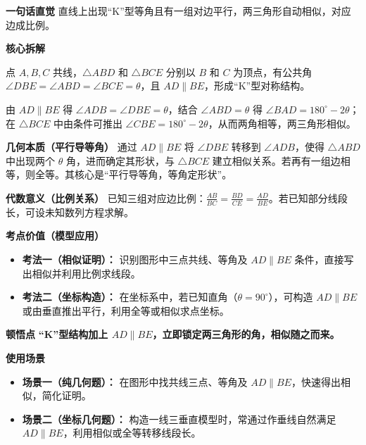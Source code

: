 \begin{explanationbox}
	\textbf{\textcolor{CExplanation}{一句话直觉}}
	直线上出现“K”型等角且有一组对边平行，两三角形自动相似，对应边成比例。

	\medskip
	\textbf{\textcolor{CExplanation}{核心拆解}}
	\begin{description}[style=nextline, leftmargin=2.8em, labelsep=0.5em, itemsep=0.45em]
		\item[\textbf{要点一（模型结构）：}]
			点 $A,B,C$ 共线，$\triangle ABD$ 和 $\triangle BCE$ 分别以 $B$ 和 $C$ 为顶点，有公共角 $\angle DBE=\angle ABD=\angle BCE=\theta$，且 $AD\parallel BE$，形成“K”型对称结构。
		\item[\textbf{要点二（相似推导）：}]
			由 $AD\parallel BE$ 得 $\angle ADB=\angle DBE=\theta$，结合 $\angle ABD=\theta$ 得 $\angle BAD=180^\circ-2\theta$；在 $\triangle BCE$ 中由条件可推出 $\angle CBE=180^\circ-2\theta$，从而两角相等，两三角形相似。
	\end{description}

	\medskip
	\textbf{\textcolor{CExplanation}{几何本质（平行导等角）}}
	通过 $AD\parallel BE$ 将 $\angle DBE$ 转移到 $\angle ADB$，使得 $\triangle ABD$ 中出现两个 $\theta$ 角，进而确定其形状，与 $\triangle BCE$ 建立相似关系。若再有一组边相等，则全等。其核心是“平行导等角，等角定形状”。

	\medskip
	\textbf{\textcolor{CExplanation}{代数意义（比例关系）}}
	已知三组对应边比例：$\frac{AB}{BC}=\frac{BD}{CE}=\frac{AD}{BE}$。若已知部分线段长，可设未知数列方程求解。

	\medskip
	\textbf{\textcolor{CExplanation}{考点价值（模型应用）}}
	\begin{itemize}[leftmargin=*, itemsep=0.5em, topsep=0.4em]
		\item \textbf{考法一（相似证明）：} 识别图形中三点共线、等角及 $AD\parallel BE$ 条件，直接写出相似并利用比例求线段。
		\item \textbf{考法二（坐标构造）：} 在坐标系中，若已知直角（$\theta=90^{\circ}$），可构造 $AD\parallel BE$ 或由垂直推出平行，利用全等或相似求点坐标。
	\end{itemize}

	\medskip
	\textbf{\textcolor{CExplanation}{顿悟点}}
	\textbf{“K”型结构加上 $AD\parallel BE$，立即锁定两三角形的角，相似随之而来。}

	\medskip
	\textbf{\textcolor{CExplanation}{使用场景}}
	\begin{itemize}[leftmargin=*, itemsep=0.5em, topsep=0.4em]
		\item \textbf{场景一（纯几何题）：} 在图形中找共线三点、等角及 $AD\parallel BE$，快速得出相似，简化证明。
		\item \textbf{场景二（坐标几何题）：} 构造一线三垂直模型时，常通过作垂线自然满足 $AD\parallel BE$，利用相似或全等转移线段长。
	\end{itemize}

\end{explanationbox}

